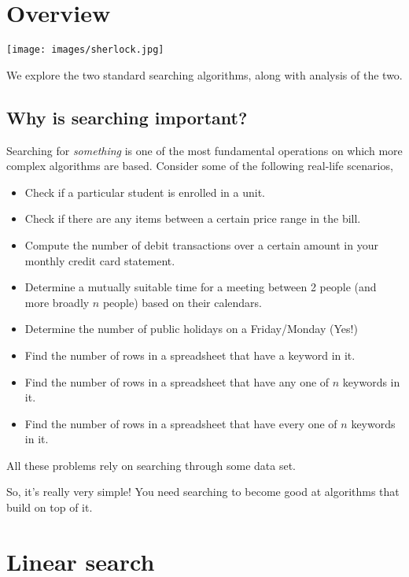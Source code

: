 \def\topic{Searching}


\section{Overview}

\begin{center}
\texttt{[image: images/sherlock.jpg]}
\end{center}

    We explore the two standard searching algorithms, along with analysis of the two.
 
\subsection{Why is searching important?}

Searching for \emph{something} is one of the most fundamental operations on which more complex algorithms are based. Consider some of the following real-life scenarios,

\begin{itemize}
\item Check if a particular student is enrolled in a unit.
\item Check if there are any items between a certain price range in the bill.
\item Compute the number of debit transactions over a certain amount in your monthly credit card statement.	
\item Determine a mutually suitable time for a meeting between 2 people (and more broadly $n$ people) based on their calendars.
\item Determine the number of public holidays on a Friday/Monday (Yes!)
\item Find the number of rows in a spreadsheet that have a keyword in it.
\item Find the number of rows in a spreadsheet that have any one of $n$ keywords in it.
\item Find the number of rows in a spreadsheet that have every one of $n$ keywords in it.
\end{itemize}

All these problems rely on searching through some data set.

So, it's really very simple! You need searching to become good at algorithms that build on top of it.

\section{Linear search}

